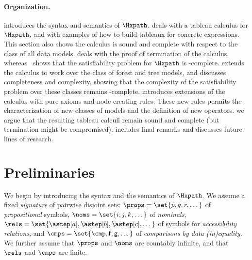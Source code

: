 \documentclass[10pt,a4paper]{amsart}
\theoremstyle{definition}
\theoremstyle{remark}
\begin{document}

\paragraph{Organization.}  
 introduces the syntax
and semantics of $\Hxpath$.   deals with a tableau calculus for
$\Hxpath$, and with examples of how to build tableaux for concrete expressions. This section also shows the calculus is sound and complete with respect to the class of all data models.
 deals with the proof of termination of the calculus, whereas~ shows that the satisfiability problem for $\Hxpath$ is \pspace-complete.
 extends the calculus to work
over the class of forest and tree models, and discusses completeness and complexity, showing that the complexity of the satisfiability problem over these classes remains \pspace-complete. 
 introduces extensions of the calculus with pure axioms and node creating rules. These new rules permits the characterization of new classes of models and the definition of new operators. we argue that the resulting tableau calculi remain sound and complete (but termination might be compromised).  includes final remarks and discusses future lines of research.




\section{Preliminaries}
\label{sec:basic}

We begin by introducing the syntax and the semantics of $\Hxpath$.
We assume a fixed \emph{signature} of pairwise disjoint sets: $\props = \set{p, q, r, \dots}$ of \emph{propositional} symbols, $\noms = \set{i, j, k, \dots}$ of \emph{nominals}, $\rels = \set{\astep[a], \astep[b], \astep[c], \dots }$ of symbols for \emph{accessibility relations}, and $\cmps = \set{\cmp, \mathsf{f}, \mathsf{g},\dots}$ of \emph{comparisons by data (in)equality}.
We further assume that $\props$ and $\noms$ are countably infinite, and that $\rels$ and $\cmps$ are finite.
    
\end{document}
